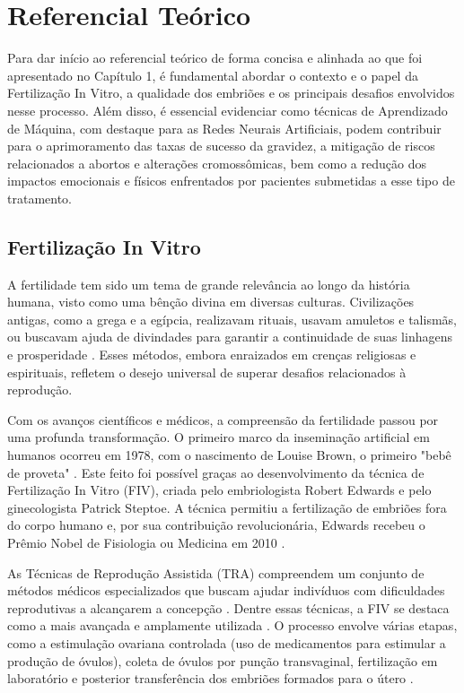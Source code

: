 \chapter[Referencial Teórico]{Referencial Teórico}

Para dar início ao referencial teórico de forma concisa e alinhada ao que foi apresentado no Capítulo 1, é fundamental abordar o contexto e o papel da Fertilização In Vitro, a qualidade dos embriões e os principais desafios envolvidos nesse processo. Além disso, é essencial evidenciar como técnicas de Aprendizado de Máquina, com destaque para as Redes Neurais Artificiais, podem contribuir para o aprimoramento das taxas de sucesso da gravidez, a mitigação de riscos relacionados a abortos e alterações cromossômicas, bem como a redução dos impactos emocionais e físicos enfrentados por pacientes submetidas a esse tipo de tratamento.

\section{Fertilização In Vitro}

A fertilidade tem sido um tema de grande relevância ao longo da história humana, visto como uma bênção divina em diversas culturas. Civilizações antigas, como a grega e a egípcia, realizavam rituais, usavam amuletos e talismãs, ou buscavam ajuda de divindades para garantir a continuidade de suas linhagens e prosperidade \cite{moura2020}. Esses métodos, embora enraizados em crenças religiosas e espirituais, refletem o desejo universal de superar desafios relacionados à reprodução.

Com os avanços científicos e médicos, a compreensão da fertilidade passou por uma profunda transformação. O primeiro marco da inseminação artificial em humanos ocorreu em 1978, com o nascimento de Louise Brown, o primeiro "bebê de proveta" \cite{moura2020}. Este feito foi possível graças ao desenvolvimento da técnica de Fertilização In Vitro (FIV), criada pelo embriologista Robert Edwards e pelo ginecologista Patrick Steptoe. A técnica permitiu a fertilização de embriões fora do corpo humano e, por sua contribuição revolucionária, Edwards recebeu o Prêmio Nobel de Fisiologia ou Medicina em 2010 \cite{corleta2010}.

As Técnicas de Reprodução Assistida (TRA) compreendem um conjunto de métodos médicos especializados que buscam ajudar indivíduos com dificuldades reprodutivas a alcançarem a concepção \cite{souzamarise2024}. Dentre essas técnicas, a FIV se destaca como a mais avançada e amplamente utilizada \cite{moura2020}. O processo envolve várias etapas, como a estimulação ovariana controlada (uso de medicamentos para estimular a produção de óvulos), coleta de óvulos por punção transvaginal, fertilização em laboratório e posterior transferência dos embriões formados para o útero \cite{moura2020}.

